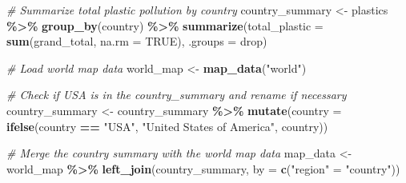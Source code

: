 \documentclass[
]{article}
\newenvironment{Shaded}{\begin{snugshade}}{\end{snugshade}}
\newcommand{\AttributeTok}[1]{\textcolor[rgb]{0.13,0.29,0.53}{#1}}
\newcommand{\CommentTok}[1]{\textcolor[rgb]{0.56,0.35,0.01}{\textit{#1}}}
\newcommand{\ConstantTok}[1]{\textcolor[rgb]{0.56,0.35,0.01}{#1}}
\newcommand{\FunctionTok}[1]{\textcolor[rgb]{0.13,0.29,0.53}{\textbf{#1}}}
\newcommand{\NormalTok}[1]{#1}
\newcommand{\OtherTok}[1]{\textcolor[rgb]{0.56,0.35,0.01}{#1}}
\newcommand{\SpecialCharTok}[1]{\textcolor[rgb]{0.81,0.36,0.00}{\textbf{#1}}}
\newcommand{\StringTok}[1]{\textcolor[rgb]{0.31,0.60,0.02}{#1}}
\begin{document}
\begin{Shaded}
\begin{Highlighting}[]
\CommentTok{\# Summarize total plastic pollution by country}
\NormalTok{country\_summary }\OtherTok{\textless{}{-}}\NormalTok{ plastics }\SpecialCharTok{\%\textgreater{}\%}
  \FunctionTok{group\_by}\NormalTok{(country) }\SpecialCharTok{\%\textgreater{}\%}
  \FunctionTok{summarize}\NormalTok{(}\AttributeTok{total\_plastic =} \FunctionTok{sum}\NormalTok{(grand\_total, }\AttributeTok{na.rm =} \ConstantTok{TRUE}\NormalTok{), }\AttributeTok{.groups =} \StringTok{\textquotesingle{}drop\textquotesingle{}}\NormalTok{)}

\CommentTok{\# Load world map data}
\NormalTok{world\_map }\OtherTok{\textless{}{-}} \FunctionTok{map\_data}\NormalTok{(}\StringTok{"world"}\NormalTok{)}

\CommentTok{\# Check if USA is in the country\_summary and rename if necessary}
\NormalTok{country\_summary }\OtherTok{\textless{}{-}}\NormalTok{ country\_summary }\SpecialCharTok{\%\textgreater{}\%}
  \FunctionTok{mutate}\NormalTok{(}\AttributeTok{country =} \FunctionTok{ifelse}\NormalTok{(country }\SpecialCharTok{==} \StringTok{"USA"}\NormalTok{, }\StringTok{"United States of America"}\NormalTok{, country))}

\CommentTok{\# Merge the country summary with the world map data}
\NormalTok{map\_data }\OtherTok{\textless{}{-}}\NormalTok{ world\_map }\SpecialCharTok{\%\textgreater{}\%}
  \FunctionTok{left\_join}\NormalTok{(country\_summary, }\AttributeTok{by =} \FunctionTok{c}\NormalTok{(}\StringTok{"region"} \OtherTok{=} \StringTok{"country"}\NormalTok{))}


\end{Highlighting}
\end{Shaded}
\end{document}
